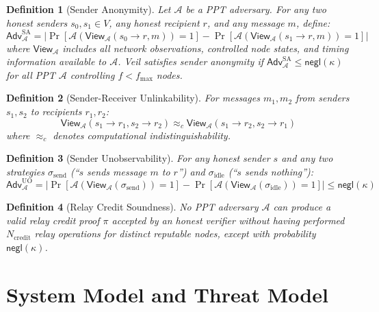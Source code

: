 \documentclass[11pt,a4paper]{article}
\newtheorem{definition}{Definition}
\newcommand{\Adv}{\mathcal{A}}
\newcommand{\negl}{\mathsf{negl}}
\newcommand{\view}{\mathsf{View}}
\begin{document}
\begin{definition}[Sender Anonymity]
\label{def:sender-anon}
Let $\Adv$ be a PPT adversary. For any two honest senders $s_0, s_1 \in V$, any honest recipient $r$, and any message $m$, define:
\[
\mathsf{Adv}^{\text{SA}}_{\Adv} = \left| \Pr[\Adv(\view_\Adv(s_0 \to r, m)) = 1] - \Pr[\Adv(\view_\Adv(s_1 \to r, m)) = 1] \right|
\]
where $\view_\Adv$ includes all network observations, controlled node states, and timing information available to $\Adv$. Veil satisfies \emph{sender anonymity} if $\mathsf{Adv}^{\text{SA}}_{\Adv} \leq \negl(\kappa)$ for all PPT $\Adv$ controlling $f < f_{\max}$ nodes.
\end{definition}

\begin{definition}[Sender-Receiver Unlinkability]
\label{def:unlinkability}
For messages $m_1, m_2$ from senders $s_1, s_2$ to recipients $r_1, r_2$:
\[
\view_\Adv(s_1 \to r_1, s_2 \to r_2) \approx_c \view_\Adv(s_1 \to r_2, s_2 \to r_1)
\]
where $\approx_c$ denotes computational indistinguishability.
\end{definition}

\begin{definition}[Sender Unobservability]
\label{def:unobservability}
For any honest sender $s$ and any two strategies $\sigma_{\text{send}}$ (``$s$ sends message $m$ to $r$'') and $\sigma_{\text{idle}}$ (``$s$ sends nothing''):
\[
\mathsf{Adv}^{\text{UO}}_{\Adv} = \left| \Pr[\Adv(\view_\Adv(\sigma_{\text{send}})) = 1] - \Pr[\Adv(\view_\Adv(\sigma_{\text{idle}})) = 1] \right| \leq \negl(\kappa)
\]
\end{definition}

\begin{definition}[Relay Credit Soundness]
\label{def:credit-soundness}
No PPT adversary $\Adv$ can produce a valid relay credit proof $\pi$ accepted by an honest verifier without having performed $N_{\text{credit}}$ relay operations for distinct reputable nodes, except with probability $\negl(\kappa)$.
\end{definition}


\section{System Model and Threat Model}
\label{sec:model}
\end{document}
